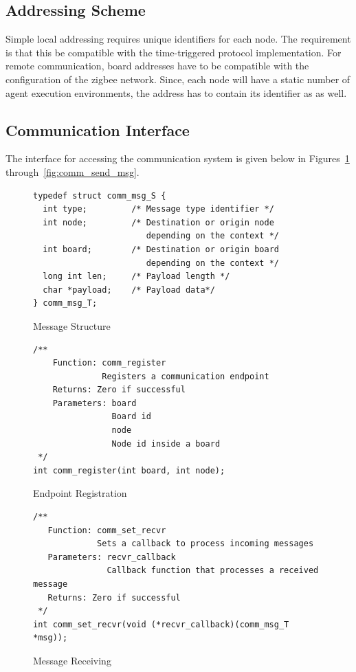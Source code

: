 \documentclass{scrreprt}
\begin{document}
\subsection{Addressing Scheme}
Simple local addressing requires unique identifiers for
each node. The requirement is that this be compatible with the time-triggered protocol
implementation. For remote communication, board addresses have to be compatible
with the configuration of the zigbee network. Since, each node will have a static 
number of agent execution environments, the address has to contain its
identifier as as well.  

\subsection{Communication Interface}
The interface for accessing the communication system is given below
in Figures~\ref{fig:msg-struct} through~\ref{fig:comm_send_msg}. %
\clearpage
\begin{figure}[!htb]
\lstset{language=C}
\begin{lstlisting}[frame=single]
typedef struct comm_msg_S {
  int type;         /* Message type identifier */
  int node;         /* Destination or origin node  
                       depending on the context */
  int board;        /* Destination or origin board 
                       depending on the context */
  long int len;     /* Payload length */
  char *payload;    /* Payload data*/  
} comm_msg_T;
\end{lstlisting}
\caption{Message Structure}
\label{fig:msg-struct}
\end{figure}

\begin{figure}[!htb]
\lstset{language=C}
\begin{lstlisting}[frame=single]
/**
    Function: comm_register 
              Registers a communication endpoint
    Returns: Zero if successful
    Parameters: board
                Board id
                node
                Node id inside a board
 */
int comm_register(int board, int node);
\end{lstlisting}
\caption{Endpoint Registration}
\label{fig:comm_reg}
\end{figure}

\begin{figure}[!htb]
\lstset{language=C}
\begin{lstlisting}[frame=single]
/**
   Function: comm_set_recvr
             Sets a callback to process incoming messages
   Parameters: recvr_callback 
               Callback function that processes a received message
   Returns: Zero if successful		  
 */
int comm_set_recvr(void (*recvr_callback)(comm_msg_T *msg));
\end{lstlisting}
\caption{Message Receiving}
\label{fig:comm_set_recvr}
\end{figure}
\end{document}
